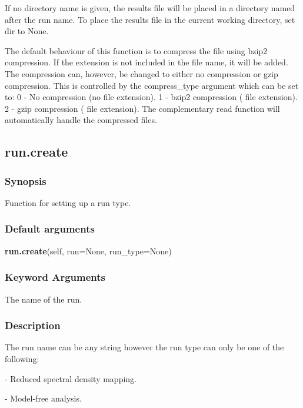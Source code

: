 If no directory name is given, the results file will be placed in a directory named after
the run name.  To place the results file in the current working directory, set dir to None.

The default behaviour of this function is to compress the file using bzip2 compression.  If
the extension 
 is not included in the file name, it will be added.  The compression
can, however, be changed to either no compression or gzip compression.  This is controlled
by the compress\_type argument which can be set to:
    0 - No compression (no file extension).
    1 - bzip2 compression (
 file extension).
    2 - gzip compression (
 file extension).
The complementary read function will automatically handle the compressed files.


\newpage

\subsection{run.create}


\subsubsection{Synopsis}

Function for setting up a run type.

\subsubsection{Default arguments}

\textsf{\textbf{run.create}(self, run=None, run\_type=None)}


\subsubsection{Keyword Arguments}

  The name of the run.


\subsubsection{Description}

The run name can be any string however the run type can only be one of the following:

    
 - Reduced spectral density mapping.
    
 - Model-free analysis.
    
